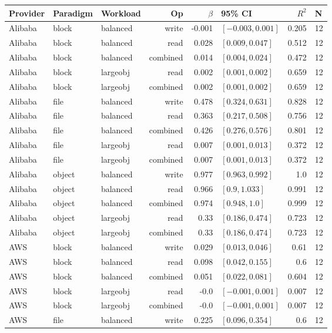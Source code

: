 \begin{tabular}{lllrrlrl}
\toprule
Provider & Paradigm & Workload & Op & $\beta$ & 95\% CI & $R^2$ & N \\
\midrule
Alibaba & block & balanced & write & -0.001 & $[-0.003, 0.001]$ & 0.205 & 12 \\
Alibaba & block & balanced & read & 0.028 & $[0.009, 0.047]$ & 0.512 & 12 \\
Alibaba & block & balanced & combined & 0.014 & $[0.004, 0.024]$ & 0.472 & 12 \\
Alibaba & block & largeobj & read & 0.002 & $[0.001, 0.002]$ & 0.659 & 12 \\
Alibaba & block & largeobj & combined & 0.002 & $[0.001, 0.002]$ & 0.659 & 12 \\
Alibaba & file & balanced & write & 0.478 & $[0.324, 0.631]$ & 0.828 & 12 \\
Alibaba & file & balanced & read & 0.363 & $[0.217, 0.508]$ & 0.756 & 12 \\
Alibaba & file & balanced & combined & 0.426 & $[0.276, 0.576]$ & 0.801 & 12 \\
Alibaba & file & largeobj & read & 0.007 & $[0.001, 0.013]$ & 0.372 & 12 \\
Alibaba & file & largeobj & combined & 0.007 & $[0.001, 0.013]$ & 0.372 & 12 \\
Alibaba & object & balanced & write & 0.977 & $[0.963, 0.992]$ & 1.0 & 12 \\
Alibaba & object & balanced & read & 0.966 & $[0.9, 1.033]$ & 0.991 & 12 \\
Alibaba & object & balanced & combined & 0.974 & $[0.948, 1.0]$ & 0.999 & 12 \\
Alibaba & object & largeobj & read & 0.33 & $[0.186, 0.474]$ & 0.723 & 12 \\
Alibaba & object & largeobj & combined & 0.33 & $[0.186, 0.474]$ & 0.723 & 12 \\
AWS & block & balanced & write & 0.029 & $[0.013, 0.046]$ & 0.61 & 12 \\
AWS & block & balanced & read & 0.098 & $[0.042, 0.155]$ & 0.6 & 12 \\
AWS & block & balanced & combined & 0.051 & $[0.022, 0.081]$ & 0.604 & 12 \\
AWS & block & largeobj & read & -0.0 & $[-0.001, 0.001]$ & 0.007 & 12 \\
AWS & block & largeobj & combined & -0.0 & $[-0.001, 0.001]$ & 0.007 & 12 \\
AWS & file & balanced & write & 0.225 & $[0.096, 0.354]$ & 0.6 & 12 \\

\end{tabular}
